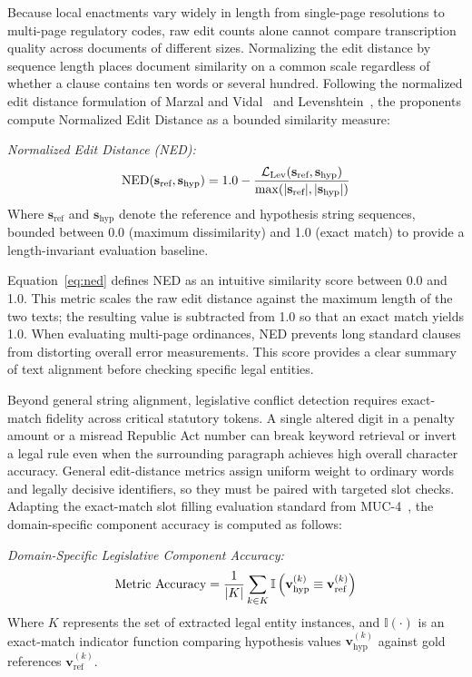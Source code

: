 Because local enactments vary widely in length from single-page resolutions to multi-page regulatory codes, raw edit counts alone cannot compare transcription quality across documents of different sizes. Normalizing the edit distance by sequence length places document similarity on a common scale regardless of whether a clause contains ten words or several hundred. Following the normalized edit distance formulation of Marzal and Vidal~\cite{marzal1993computation} and Levenshtein~\cite{levenshtein1966binary}, the proponents compute Normalized Edit Distance as a bounded similarity measure:

\noindent\textit{Normalized Edit Distance (NED):}
\begin{equation}
    \text{NED}(\mathbf{s}_{\text{ref}}, \mathbf{s}_{\text{hyp}}) = 1.0 - \frac{\mathcal{L}_{\text{Lev}}(\mathbf{s}_{\text{ref}}, \mathbf{s}_{\text{hyp}})}{\max(|\mathbf{s}_{\text{ref}}|, |\mathbf{s}_{\text{hyp}}|)}
    \label{eq:ned}
    \eqcaption{Normalized Edit Distance (NED)}
\end{equation}
\noindent Where $\mathbf{s}_{\text{ref}}$ and $\mathbf{s}_{\text{hyp}}$ denote the reference and hypothesis string sequences, bounded between 0.0 (maximum dissimilarity) and 1.0 (exact match) to provide a length-invariant evaluation baseline.

Equation~\ref{eq:ned} defines NED as an intuitive similarity score between 0.0 and 1.0. This metric scales the raw edit distance against the maximum length of the two texts; the resulting value is subtracted from 1.0 so that an exact match yields 1.0. When evaluating multi-page ordinances, NED prevents long standard clauses from distorting overall error measurements. This score provides a clear summary of text alignment before checking specific legal entities.

Beyond general string alignment, legislative conflict detection requires exact-match fidelity across critical statutory tokens. A single altered digit in a penalty amount or a misread Republic Act number can break keyword retrieval or invert a legal rule even when the surrounding paragraph achieves high overall character accuracy. General edit-distance metrics assign uniform weight to ordinary words and legally decisive identifiers, so they must be paired with targeted slot checks. Adapting the exact-match slot filling evaluation standard from MUC-4~\cite{chinchor1992muc4}, the domain-specific component accuracy is computed as follows:

\noindent\textit{Domain-Specific Legislative Component Accuracy:}
\begin{equation}
    \text{Metric Accuracy} = \frac{1}{|K|} \sum_{k \in K} \mathbb{I}\left( \mathbf{v}_{\text{hyp}}^{(k)} \equiv \mathbf{v}_{\text{ref}}^{(k)} \right)
    \label{eq:legal_metric_acc}
    \eqcaption{Domain-Specific Legislative Component Accuracy}
\end{equation}
\noindent Where $K$ represents the set of extracted legal entity instances, and $\mathbb{I}(\cdot)$ is an exact-match indicator function comparing hypothesis values $\mathbf{v}_{\text{hyp}}^{(k)}$ against gold references $\mathbf{v}_{\text{ref}}^{(k)}$.

